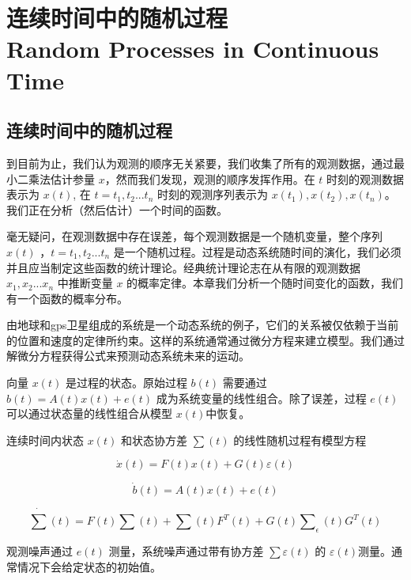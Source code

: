 \section[连续时间中的随机过程]{连续时间中的随机过程\\Random Processes in Continuous Time}
	\subsection{连续时间中的随机过程}
	
	到目前为止，我们认为观测的顺序无关紧要，我们收集了所有的观测数据，通过最小二乘法估计参量 $x$，然而我们发现，观测的顺序发挥作用。在 $ t $ 时刻的观测数据表示为 $ x(t) $, 在 $t=t_{1},t_{2}...t_{n} $ 时刻的观测序列表示为 $ x(t_{1}),x(t_{2}),x(t_{n}) $。我们正在分析（然后估计）一个时间的函数。
	
	毫无疑问，在观测数据中存在误差，每个观测数据是一个随机变量，整个序列 $ x(t) $ ，$ t=t_{1},t_{2}...t_{n} $ 是一个随机过程。过程是动态系统随时间的演化，我们必须并且应当制定这些函数的统计理论。经典统计理论志在从有限的观测数据 $ x_{1},x_{2}...x_{n} $ 中推断变量 $  x $ 的概率定律。本章我们分析一个随时间变化的函数，我们有一个函数的概率分布。
	
	由地球和gps卫星组成的系统是一个动态系统的例子，它们的关系被仅依赖于当前的位置和速度的定律所约束。这样的系统通常通过微分方程来建立模型。我们通过解微分方程获得公式来预测动态系统未来的运动。
	
	向量 $ x(t) $  是过程的状态。原始过程 $ b(t) $ 需要通过  $ b(t)=A(t)x(t)+e(t) $ 成为系统变量的线性组合。除了误差，过程 $ e(t) $ 可以通过状态量的线性组合从模型 $ x(t) $中恢复。
	
	连续时间内状态 $ x(t) $  和状态协方差 $ \sum(t) $ 的线性随机过程有模型方程
	
   \begin{equation}\label{5.1}
  \dot{x}(t)=F(t)x(t)+G(t)\varepsilon(t)
  \end{equation}
  
  \begin{equation}\label{5.2}
  \dot{b}(t)=A(t)x(t)+e(t)
  \end{equation}
  
  \begin{equation}\label{5.3}
  \dot{\sum}(t)=F(t)\sum(t)+\sum(t)F^{T}(t)+G(t)\sum\nolimits_{\epsilon}(t)G^{T}(t)
  \end{equation}
	
	观测噪声通过  $ e(t) $ 测量，系统噪声通过带有协方差 $ \sum \varepsilon (t) $ 的 $ \varepsilon(t) $测量。通常情况下会给定状态的初始值。
	
